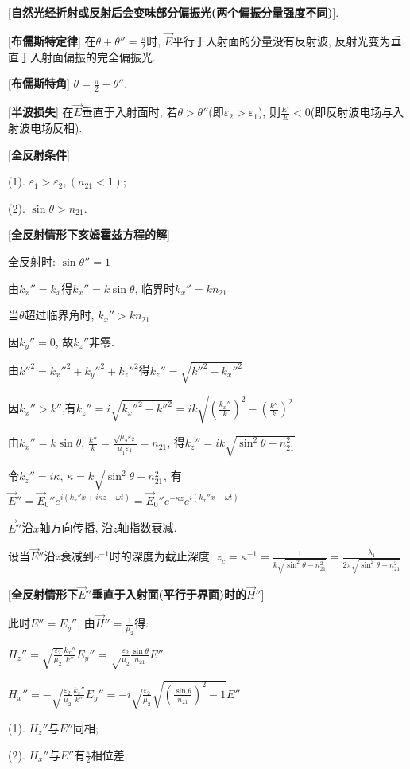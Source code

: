 [\textbf{自然光经折射或反射后会变味部分偏振光(两个偏振分量强度不同)}].\par

[\textbf{布儒斯特定律}] 在$\theta+\theta''=\frac{\pi}{2}$时, $\vec E$平行于入射面的分量没有反射波, 反射光变为垂直于入射面偏振的完全偏振光.\par

[\textbf{布儒斯特角}] $\theta=\frac{\pi}{2}-\theta''$.\par

[\textbf{半波损失}] 在$\vec E$垂直于入射面时, 若$\theta>\theta''$(即$\varepsilon_2>\varepsilon_1$), 则$\frac{E'}{E}<0$(即反射波电场与入射波电场反相).\par

[\textbf{全反射条件}]\par
\qquad (1). $\varepsilon_1>\varepsilon_2, (n_{21}<1)$;\par
\qquad (2). $\sin\theta>n_{21}$.\par

\clearpage

[\textbf{全反射情形下亥姆霍兹方程的解}]\par
\qquad 全反射时: $\sin\theta''=1$\par
\qquad 由$k_x''=k_x$得$k_x''=k\sin\theta$, 临界时$k_x''=kn_{21}$\par
\qquad 当$\theta$超过临界角时, $k_x''>kn_{21}$\par
\qquad 因$k_y''=0$, 故$k_z''$非零.\par
\qquad 由$k''^2=k_x''^2+k_y''^2+k_z''^2$得$k_z''=\sqrt{k''^2-k_x''^2}$\par
\qquad 因$k_x''>k''$,有$k_z''=i\sqrt{k_x''^2-k''^2}=ik\sqrt{\left(\frac{k_x''}{k}\right)^2-\left(\frac{k''}{k}\right)^2}$\par
\qquad 由$k_x''=k\sin\theta$, $\frac{k''}{k}=\frac{\sqrt{\mu_2\varepsilon_2}}{\mu_1\varepsilon_1}=n_{21}$, 得$k_z''=ik\sqrt{\sin^2\theta-n_{21}^2}$\par
\qquad 令$k_z''=i\kappa$, $\kappa=k\sqrt{\sin^2\theta-n_{21}^2}$, 有$\vec E''=\vec E_0''e^{i(k_x''x+i\kappa z-\omega t)}=\vec E_0''e^{-\kappa z}e^{i(k_x''x-\omega t)}$\par
\qquad $\vec E''$沿$x$轴方向传播, 沿$z$轴指数衰减.\par
\qquad \qquad 设当$\vec E''$沿$z$衰减到$e^{-1}$时的深度为截止深度: $z_c=\kappa^{-1}=\frac{1}{k\sqrt{\sin^2\theta-n_{21}^2}}=\frac{\lambda_1}{2\pi\sqrt{\sin^2\theta-n_{21}^2}}$\par

[\textbf{全反射情形下$\vec E''$垂直于入射面(平行于界面)时的$\vec H''$}]\par
\qquad 此时$E''=E_y''$, 由$\vec H''=\frac{1}{\mu_2}$得:\par
\qquad \qquad $H_z''=\sqrt{\frac{\varepsilon_2}{\mu_2}}\frac{k_x''}{k''}E_y''=\sqrt\frac{\varepsilon_2}{\mu_2}\frac{\sin\theta}{n_{21}}E''$\par
\qquad \qquad $H_x''=-\sqrt{\frac{\varepsilon_2}{\mu_2}}\frac{k_z''}{k''}E_y''=-i\sqrt{\frac{\varepsilon_2}{\mu_2}}\sqrt{\left(\frac{\sin\theta}{n_{21}}\right)^2-1}E''$\par
\qquad (1). $H_z''$与$E''$同相;\par
\qquad (2). $H_x''$与$E''$有$\frac{\pi}{2}$相位差.\par

